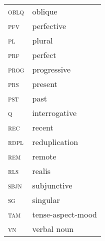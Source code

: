 \documentclass[output=paper]{langsci/langscibook}
\begin{document}
\begin{tabularx}{.33\textwidth}{ll}
\textsc{oblq}  & oblique  \\
\textsc{pfv}  & perfective  \\
\textsc{pl}  & plural\\
\textsc{prf}  & perfect  \\
\textsc{prog}  & progressive \\ 
\textsc{prs}  & present\\
\textsc{pst}  & past  \\
\textsc{q}  & interrogative\\  
\textsc{rec}  & recent\\
\textsc{rdpl}  &reduplication  \\
\textsc{rem}  & remote  \\
\textsc{rls}  & realis\\
\textsc{sbjn}  & subjunctive\\  
\textsc{sg}  & singular  \\
\textsc{tam}  & tense-aspect-mood \textsc{}\\
\textsc{vn    }   & verbal noun\\
\end{tabularx}
\end{document}
